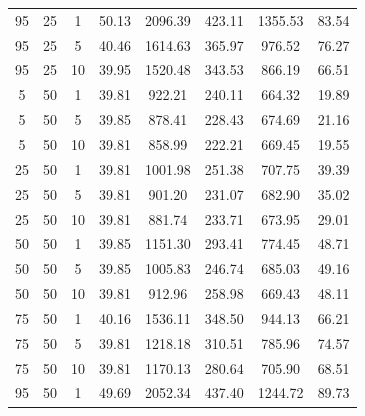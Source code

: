 \begin{table}[H]
\begin{tabular}{ccc|c|c|c|c|c}
95 & 25 & 1 & \cellcolor{gray!1}50.13 & \cellcolor{gray!1}2096.39 & \cellcolor{gray!1}423.11 & \cellcolor{gray!1}1355.53 & 83.54\\
95 & 25 & 5 & \cellcolor{gray!44}40.46 & \cellcolor{gray!1}1614.63 & \cellcolor{gray!1}365.97 & \cellcolor{gray!1}976.52 & 76.27\\
95 & 25 & 10 & \cellcolor{gray!49}39.95 & \cellcolor{gray!1}1520.48 & \cellcolor{gray!1}343.53 & \cellcolor{gray!1}866.19 & 66.51\\
5 & 50 & 1 & \cellcolor{gray!50}39.81 & \cellcolor{gray!18}922.21 & \cellcolor{gray!1}240.11 & \cellcolor{gray!49}664.32 & 19.89\\
5 & 50 & 5 & \cellcolor{gray!50}39.85 & \cellcolor{gray!25}878.41 & \cellcolor{gray!2}228.43 & \cellcolor{gray!46}674.69 & 21.16\\
5 & 50 & 10 & \cellcolor{gray!50}39.81 & \cellcolor{gray!28}858.99 & \cellcolor{gray!8}222.21 & \cellcolor{gray!48}669.45 & 19.55\\
25 & 50 & 1 & \cellcolor{gray!50}39.81 & \cellcolor{gray!4}1001.98 & \cellcolor{gray!1}251.38 & \cellcolor{gray!36}707.75 & 39.39\\
25 & 50 & 5 & \cellcolor{gray!50}39.81 & \cellcolor{gray!21}901.20 & \cellcolor{gray!1}231.07 & \cellcolor{gray!43}682.90 & 35.02\\
25 & 50 & 10 & \cellcolor{gray!50}39.81 & \cellcolor{gray!24}881.74 & \cellcolor{gray!1}233.71 & \cellcolor{gray!46}673.95 & 29.01\\
50 & 50 & 1 & \cellcolor{gray!50}39.85 & \cellcolor{gray!1}1151.30 & \cellcolor{gray!1}293.41 & \cellcolor{gray!15}774.45 & 48.71\\
50 & 50 & 5 & \cellcolor{gray!50}39.85 & \cellcolor{gray!4}1005.83 & \cellcolor{gray!1}246.74 & \cellcolor{gray!43}685.03 & 49.16\\
50 & 50 & 10 & \cellcolor{gray!50}39.81 & \cellcolor{gray!19}912.96 & \cellcolor{gray!1}258.98 & \cellcolor{gray!48}669.43 & 48.11\\
75 & 50 & 1 & \cellcolor{gray!47}40.16 & \cellcolor{gray!1}1536.11 & \cellcolor{gray!1}348.50 & \cellcolor{gray!1}944.13 & 66.21\\
75 & 50 & 5 & \cellcolor{gray!50}39.81 & \cellcolor{gray!1}1218.18 & \cellcolor{gray!1}310.51 & \cellcolor{gray!12}785.96 & 74.57\\
75 & 50 & 10 & \cellcolor{gray!50}39.81 & \cellcolor{gray!1}1170.13 & \cellcolor{gray!1}280.64 & \cellcolor{gray!36}705.90 & 68.51\\
95 & 50 & 1 & \cellcolor{gray!1}49.69 & \cellcolor{gray!1}2052.34 & \cellcolor{gray!1}437.40 & \cellcolor{gray!1}1244.72 & 89.73\\

\end{tabular}
\end{table}
